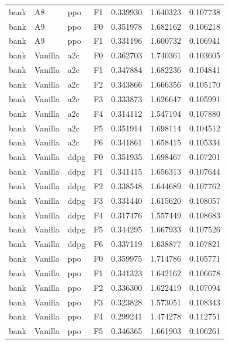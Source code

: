 \begin{tabular}{llllrrr}
      bank &      A8 &       ppo &  F1 &  0.339930 &  1.640323 &  0.107738 \\
      bank &      A9 &       ppo &  F0 &  0.351978 &  1.682162 &  0.106218 \\
      bank &      A9 &       ppo &  F1 &  0.331196 &  1.600732 &  0.106941 \\
      bank & Vanilla &       a2c &  F0 &  0.362703 &  1.740361 &  0.103605 \\
      bank & Vanilla &       a2c &  F1 &  0.347884 &  1.682236 &  0.104841 \\
      bank & Vanilla &       a2c &  F2 &  0.343866 &  1.666356 &  0.105170 \\
      bank & Vanilla &       a2c &  F3 &  0.333873 &  1.626647 &  0.105991 \\
      bank & Vanilla &       a2c &  F4 &  0.314112 &  1.547194 &  0.107880 \\
      bank & Vanilla &       a2c &  F5 &  0.351914 &  1.698114 &  0.104512 \\
      bank & Vanilla &       a2c &  F6 &  0.341861 &  1.658415 &  0.105334 \\
      bank & Vanilla &      ddpg &  F0 &  0.351935 &  1.698467 &  0.107201 \\
      bank & Vanilla &      ddpg &  F1 &  0.341415 &  1.656313 &  0.107644 \\
      bank & Vanilla &      ddpg &  F2 &  0.338548 &  1.644689 &  0.107762 \\
      bank & Vanilla &      ddpg &  F3 &  0.331440 &  1.615620 &  0.108057 \\
      bank & Vanilla &      ddpg &  F4 &  0.317476 &  1.557449 &  0.108683 \\
      bank & Vanilla &      ddpg &  F5 &  0.344295 &  1.667933 &  0.107526 \\
      bank & Vanilla &      ddpg &  F6 &  0.337119 &  1.638877 &  0.107821 \\
      bank & Vanilla &       ppo &  F0 &  0.359975 &  1.714786 &  0.105771 \\
      bank & Vanilla &       ppo &  F1 &  0.341323 &  1.642162 &  0.106678 \\
      bank & Vanilla &       ppo &  F2 &  0.336300 &  1.622419 &  0.107094 \\
      bank & Vanilla &       ppo &  F3 &  0.323828 &  1.573051 &  0.108343 \\
      bank & Vanilla &       ppo &  F4 &  0.299241 &  1.474278 &  0.112751 \\
      bank & Vanilla &       ppo &  F5 &  0.346365 &  1.661903 &  0.106261 \\

\end{tabular}
